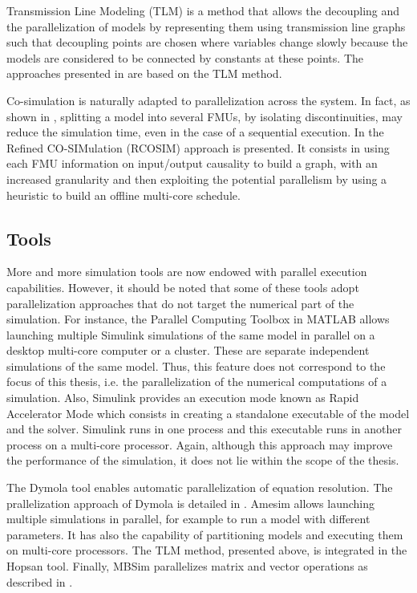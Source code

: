 Transmission Line Modeling (TLM) \cite{hui:1990} is a method that allows the decoupling and the parallelization of models by representing them using transmission line graphs such that decoupling points are chosen where variables change slowly because the models are considered to be connected by constants at these points. The approaches presented in \cite{sjolund:2010,braun:2012} are based on the TLM method. 

Co-simulation is naturally adapted to parallelization across the system. In fact, as shown in \cite{Benkhaled_A_2012_ECOSM}, splitting a model into several FMUs, by isolating discontinuities, may reduce the simulation time, even in the case of a sequential execution. In \cite{benkhaled:2014} the Refined CO-SIMulation (RCOSIM) approach is presented. It consists in using each FMU information on input/output causality to build a graph, with an increased granularity and then exploiting the potential parallelism by using a heuristic to build an offline multi-core schedule.

\subsection{Tools}

More and more simulation tools are now endowed with parallel execution capabilities. However, it should be noted that some of these tools adopt parallelization approaches that do not target the numerical part of the simulation. For instance, the Parallel Computing Toolbox in MATLAB allows launching multiple Simulink simulations of the same model in parallel on a desktop multi-core computer or a cluster. These are separate independent simulations of the same model. Thus, this feature does not correspond to the focus of this thesis, i.e. the parallelization of the numerical computations of a simulation. Also, Simulink provides an execution mode known as Rapid Accelerator Mode which consists in creating a standalone executable of the model and the solver. Simulink runs in one process and this executable runs in another process on a multi-core processor. Again, although this approach may improve the performance of the simulation, it does not lie within the scope of the thesis.

The Dymola tool enables automatic parallelization of equation resolution. The prallelization approach of Dymola is detailed in \cite{elmqvist:2014}. Amesim allows launching multiple simulations in parallel, for example to run a model with different parameters. It has also the capability of partitioning models and executing them on multi-core processors. The TLM method, presented above, is integrated in the Hopsan tool. Finally, MBSim parallelizes matrix and vector operations as described in \cite{clauberg:2012}. 